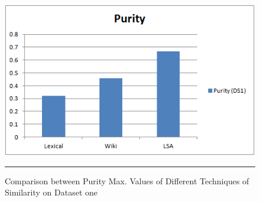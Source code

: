 \begin{figure}[htbp]
	\centering
		\includegraphics{./Figures/Purity_DS1_1.png}
		\rule{35em}{0.5pt}
	\caption[Comparison between Purity Max. Values of Different Techniques of Similarity on Dataset one]{Comparison between Purity Max. Values of Different Techniques of Similarity on Dataset one}
	\label{fig:F120}
\end{figure}

